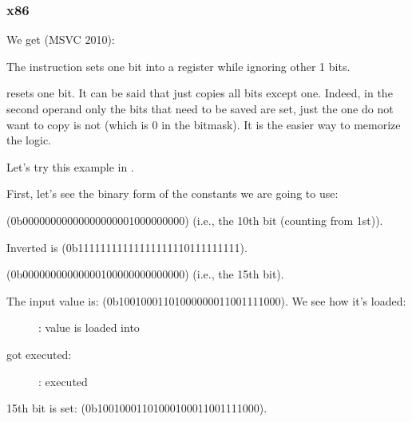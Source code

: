 \subsubsection{x86}


We get (MSVC 2010):




The \OR instruction sets one bit into a register while ignoring other 1 bits.


\AND resets one bit. It can be said that \AND just copies all bits except one.
Indeed, in the second \AND operand only the bits that need to be saved are set,
just the one do not want to copy is not (which is 0 in the bitmask).
It is the easier way to memorize the logic.

\clearpage
\mysubparagraph{\olly}

Let's try this example in \olly.

First, let's see the binary form of the constants we are going to use:

 (0b0000000000000000000{\color{red}1}000000000) (i.e., the 10th bit (counting from 1st)).

Inverted  is  (0b1111111111111111111{\color{red}0}111111111).

 (0b00000000000000{\color{red}1}00000000000000) (i.e., the 15th bit).

The input value is:  (0b10010001101000000011001111000).
We see how it's loaded:

\begin{figure}[H]
\centering
{}
\caption{\olly: value is loaded into \ECX}
\label{fig:set_reset_olly1}
\end{figure}

\clearpage
\OR got executed:

\begin{figure}[H]
\centering
{}
\caption{\olly: \OR executed}
\label{fig:set_reset_olly2}
\end{figure}

15th bit is set:  
(0b10010001101000{\color{red}1}00011001111000).

